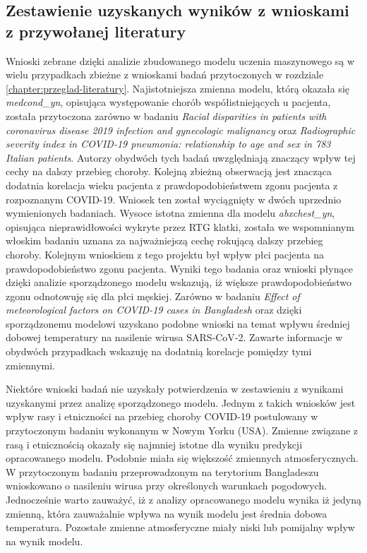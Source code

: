 \documentclass[polish, twoside, 12pt, a4paper]{article}
\theoremstyle{definition}
\theoremstyle{plain}
\theoremstyle{remark}
\begin{document}
\subsection{Zestawienie uzyskanych wyników z wnioskami z przywołanej literatury}

Wnioski zebrane dzięki analizie zbudowanego modelu uczenia maszynowego są w wielu przypadkach zbieżne z wnioskami badań przytoczonych w rozdziale \ref{chapter:przeglad-literatury}. Najistotniejsza zmienna modelu, którą okazała się \emph{medcond\_yn}, opisująca występowanie chorób współistniejących u pacjenta, została przytoczona zarówno w badaniu \emph{Racial disparities in patients with coronavirus disease 2019 infection and gynecologic malignancy} oraz \emph{Radiographic severity index in COVID-19 pneumonia: relationship to age and sex in 783 Italian patients}. Autorzy obydwóch tych badań uwzględniają znaczący wpływ tej cechy na dalszy przebieg choroby. Kolejną zbieżną obserwacją jest znacząca dodatnia korelacja wieku pacjenta z prawdopodobieństwem zgonu pacjenta z rozpoznanym COVID-19. Wniosek ten został wyciągnięty w dwóch uprzednio wymienionych badaniach. Wysoce istotna zmienna dla modelu \emph{abxchest\_yn}, opisująca nieprawidłowości wykryte przez RTG klatki, została we wspomnianym  włoskim badaniu uznana za najważniejszą cechę rokującą dalszy przebieg choroby. Kolejnym wnioskiem z tego projektu był wpływ płci pacjenta na prawdopodobieństwo zgonu pacjenta. Wyniki tego badania oraz wnioski płynące dzięki analizie sporządzonego modelu wskazują, iż większe prawdopodobieństwo zgonu odnotowuję się dla płci męskiej. Zarówno w badaniu \emph{Effect of meteorological factors on COVID-19 cases in Bangladesh} oraz dzięki sporządzonemu modelowi uzyskano podobne wnioski na temat wpływu średniej dobowej temperatury na nasilenie wirusa SARS‑CoV‑2. Zawarte informacje w obydwóch przypadkach wskazuję na dodatnią korelacje pomiędzy tymi zmiennymi.

Niektóre wnioski badań nie uzyskały potwierdzenia w zestawieniu z wynikami uzyskanymi przez analizę sporządzonego modelu. Jednym z takich wniosków jest wpływ rasy i etniczności na przebieg choroby COVID-19 postulowany w przytoczonym badaniu wykonanym w Nowym Yorku (USA). Zmienne związane z rasą i etnicznością okazały się najmniej istotne dla wyniku predykcji opracowanego modelu. Podobnie miała się większość zmiennych atmosferycznych. W przytoczonym badaniu przeprowadzonym na terytorium Bangladeszu wnioskowano o nasileniu wirusa przy określonych warunkach pogodowych. Jednocześnie warto zauważyć, iż z analizy opracowanego modelu wynika iż jedyną zmienną, która zauważalnie wpływa na wynik modelu jest średnia dobowa temperatura. Pozostałe zmienne atmosferyczne miały niski lub pomijalny wpływ na wynik modelu.
\end{document}
